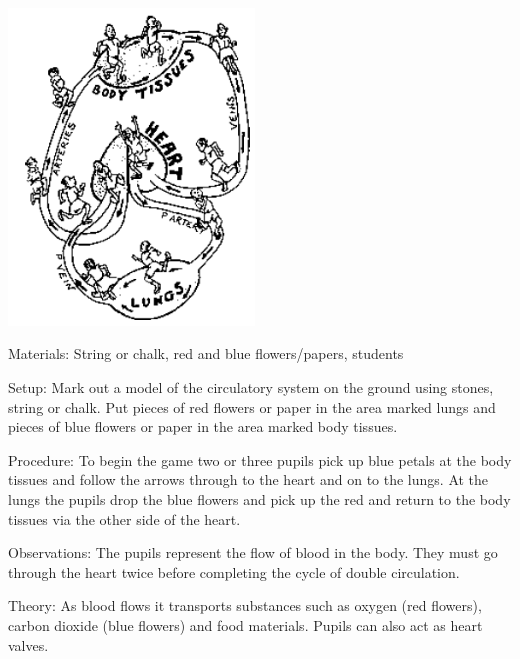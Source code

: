 \begin{multicols}{2}
\begin{center}
\includegraphics[width=0.49\textwidth]{./img/source/circulation-game.png}
\end{center}

\begin{description*}
\item[Materials:]{String or chalk, red and blue flowers/papers, students}
\item[Setup:]{Mark out a model of the circulatory system on the ground using stones, string or chalk. Put
pieces of red flowers or paper in the area marked lungs and pieces of blue flowers or paper in
the area marked body tissues. }
\item[Procedure:]{To begin the game two or three pupils pick up blue petals at
the body tissues and follow the arrows through to the heart and on to the lungs. At the lungs
the pupils drop the blue flowers and pick up the red and return to the body tissues via the
other side of the heart.}
\item[Observations:]{The pupils represent the flow of blood in the body. They must go through the heart twice
before completing the cycle of double circulation. }
\item[Theory:]{As blood flows it transports substances
such as oxygen (red flowers), carbon dioxide (blue flowers) and food materials. Pupils can
also act as heart valves.}
\end{description*}


\end{multicols}
